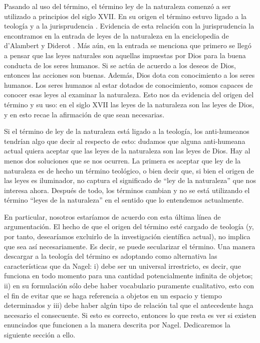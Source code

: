 Pasando al uso del término, el término ley de la naturaleza comenzó a ser utilizado a principios del siglo XVII. En su origen el término estuvo ligado a la teología y a la jurisprudencia \cite{Giere2006, Giere1999}. Evidencia de esta relación con la jurisprudencia la encontramos en la entrada de leyes de la naturaleza en la enciclopedia de d'Alambert y Diderot \cite{lawna}. Más aún, en la entrada se menciona que primero se llegó a pensar que las leyes naturales son aquellas impuestas por Dios para la buena conducta de los seres humanos. Si se actúa de acuerdo a los deseos de Dios, entonces las acciones son buenas. Además, Dios dota con conocimiento a los seres humanos. Los seres humanos al estar dotados de conocimiento, somos capaces de conocer esas leyes al examinar la naturaleza. Esto nos da evidencia del origen del término y su uso: en el siglo XVII las leyes de la naturaleza son las leyes de Dios, y en esto recae la afirmación de que sean necesarias.

Si el término de ley de la naturaleza está ligado a la teología, los anti-humeanos tendrían algo que decir al respecto de esto: dudamos que alguna anti-humeana actual quiera aceptar que las leyes de la naturaleza son las leyes de Dios. Hay al menos dos soluciones que se nos ocurren. La primera es aceptar que ley de la naturaleza es de hecho un término teológico, o bien decir que, si bien el origen de las leyes es iluminador, no captura el significado de ``ley de la naturaleza'' que nos interesa ahora. Después de todo, los términos cambian y no se está utilizando el término ``leyes de la naturaleza'' en el sentido que lo entendemos actualmente.

En particular, nosotros estaríamos de acuerdo con esta última línea de argumentación. El hecho de que el origen del término esté cargado de teología (y, por tanto, desearíamos excluirlo de la investigación científica actual), no implica que sea así necesariamente. Es decir, se puede secularizar el término. Una manera descargar a la teología del término es adoptando como alternativa las características que da Nagel: i) debe ser un universal irrestricto, es decir, que funciona en todo momento para una cantidad potencialmente infinita de objetos; ii) en su formulación sólo debe haber vocabulario puramente cualitativo, esto con el fin de evitar que se haga referencia a objetos en un espacio y tiempo determinados y iii) debe haber algún tipo de relación tal que el antecedente haga necesario el consecuente. Si esto es correcto, entonces lo que resta es ver si existen enunciados que funcionen a la manera descrita por Nagel. Dedicaremos la siguiente sección a ello.

